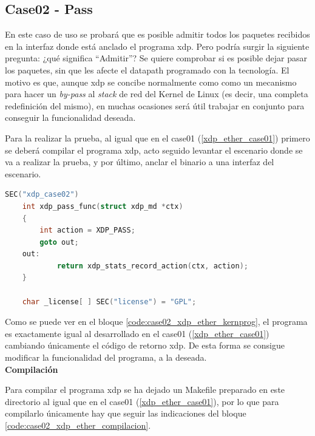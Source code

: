 \subsection{Case02 - Pass}
\label{xdp_ether_case02}

En este caso de uso se probará que es posible admitir todos los paquetes recibidos en la interfaz donde está anclado el programa \gls{xdp}. Pero podría surgir la siguiente pregunta: ¿qué significa ``Admitir”? Se quiere comprobar si es posible dejar pasar los paquetes, sin que les afecte el datapath programado con la tecnología. El motivo es que, aunque \gls{xdp} se concibe normalmente como como un mecanismo para hacer un \textit{by-pass} al \textit{stack} de red del Kernel de Linux (es decir, una completa redefinición del mismo), en muchas ocasiones será útil trabajar en conjunto para conseguir la funcionalidad deseada. \\
\par
Para la realizar la prueba, al igual que en el case01 (\ref{xdp_ether_case01}) primero se deberá compilar el programa \gls{xdp}, acto seguido levantar el escenario donde se va a realizar la prueba, y por último, anclar el binario a una interfaz del escenario.

\begin{lstlisting}[language=C, style=C-color, caption={Programa básico XDP - Case01},label=code:case02_xdp_ether_kernprog]
    SEC("xdp_case02")
    int xdp_pass_func(struct xdp_md *ctx)
    {
    	int action = XDP_PASS;
    	goto out;
    out:
            return xdp_stats_record_action(ctx, action);
    }
    
    char _license[ ] SEC("license") = "GPL";
\end{lstlisting}
\vspace{0.5cm}

Como se puede ver en el bloque \ref{code:case02_xdp_ether_kernprog}, el programa es exactamente igual al desarrollado en el case01 (\ref{xdp_ether_case01}) cambiando únicamente el código de retorno \gls{xdp}. De esta forma se consigue modificar la funcionalidad del programa, a la deseada.\\

\vspace{0.3cm}
\textbf{Compilación}\\
\par

Para compilar el programa \gls{xdp} se ha dejado un Makefile preparado en este directorio al igual que en el case01 (\ref{xdp_ether_case01}), por lo que para compilarlo únicamente hay que seguir las indicaciones del bloque \ref{code:case02_xdp_ether_compilacion}.

